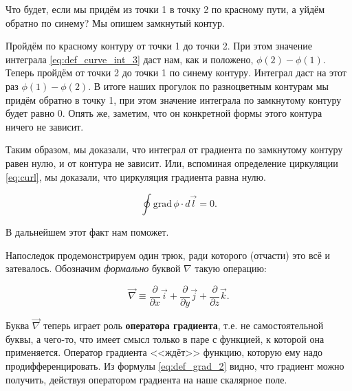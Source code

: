 \documentclass[a4paper,12pt]{article}
\numberwithin{equation}{section}
\newcommand{\pt}{\partial}
\newcommand{\grad}{\mathrm{grad}\,}
\begin{document}
Что будет, если мы придём из точки 1 в точку 2 по красному пути, а
уйдём обратно по синему? Мы опишем замкнутый контур. 

\begin{figure}
  \vspace{-0.75cm}
  \begin{center}
  \end{center}
  \vspace{-0.7cm}
  \label{fig:path_indep}
\end{figure}

Пройдём по красному контуру от точки 1 до точки 2. При этом значение
интеграла \eqref{eq:def_curve_int_3} даст нам, как и положено, $\phi(2)
- \phi(1)$. Теперь пройдём от точки 2 до точки 1 по синему
контуру. Интеграл даст на этот раз $\phi(1) - \phi(2)$. В итоге наших
прогулок по разноцветным контурам мы придём обратно в точку 1, при
этом значение интеграла по замкнутому контуру будет равно 0. Опять же,
заметим, что он конкретной формы этого контура ничего не зависит. 

Таким образом, мы доказали, что интеграл от градиента по замкнутому
контуру равен нулю, и от контура не зависит. Или, вспоминая
определение циркуляции \eqref{eq:curl}, мы доказали, что циркуляция
градиента равна нулю.

\begin{equation}
  \label{eq:int_grad}
  \oint \grad \phi \cdot  d\vec{l} =0.
\end{equation}

В дальнейшем этот факт нам поможет. 

Напоследок продемонстрируем один трюк, ради которого (отчасти) это всё
и затевалось. Обозначим \emph{формально} буквой $\nabla$ такую
операцию:

\begin{equation}
  \label{eq:def_nabla}
  \vec{\nabla} \equiv \frac{\pt}{\pt x} \vec{i} +  \frac{\pt}{\pt y}
  \vec{j} +  \frac{\pt}{\pt z} \vec{k}.
\end{equation}

Буква $\vec{\nabla}$ теперь играет роль \textbf{оператора градиента},
т.е. не самостоятельной буквы, а чего-то, что имеет смысл только в
паре с функцией, к которой она применяется. Оператор градиента
<<ждёт>> функцию, которую ему надо продифференцировать. Из формулы
\eqref{eq:def_grad_2} видно, что градиент можно получить, действуя
оператором градиента на наше скалярное поле.
\end{document}
